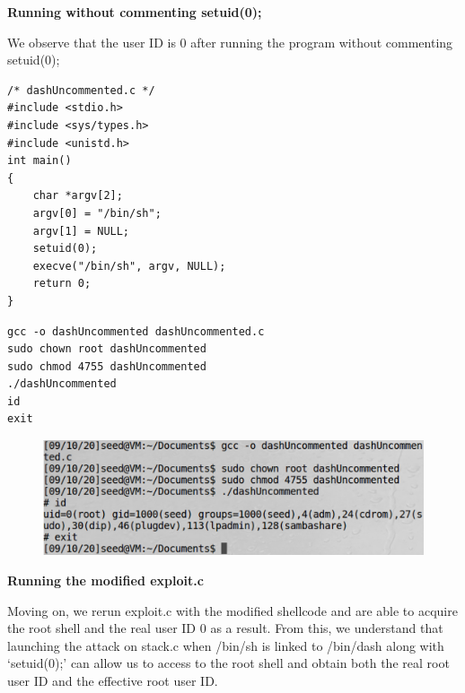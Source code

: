 \documentclass[12pt]{article}
\def\bsq#1{\lq{#1}\rq}
\begin{document}
\newpage

\begin{center}
    \textbf{Running without commenting setuid(0);}
\end{center}

\noindent
We observe that the user ID is 0 after running the program
without commenting setuid(0);

\begin{lstlisting}
/* dashUncommented.c */
#include <stdio.h>
#include <sys/types.h>
#include <unistd.h>
int main()
{
    char *argv[2];
    argv[0] = "/bin/sh";
    argv[1] = NULL;
    setuid(0);
    execve("/bin/sh", argv, NULL);
    return 0;
}
\end{lstlisting}

\begin{framed}
    \begin{verbatim}
gcc -o dashUncommented dashUncommented.c
sudo chown root dashUncommented
sudo chmod 4755 dashUncommented
./dashUncommented
id
exit
    \end{verbatim}
\end{framed}

\begin{figure}[H]
    \centering
    \includegraphics[width=1\textwidth]{bf-dash-uncommented.png}
\end{figure}



\newpage

\begin{center}
    \textbf{Running the modified exploit.c}
\end{center}

\noindent
Moving on, we rerun exploit.c with the modified shellcode and are able to acquire
the root shell and the real user ID 0 as a result. From this, we understand that
launching the attack on stack.c when /bin/sh is linked to /bin/dash along with
\bsq{setuid(0);} can allow us to access to the root shell and obtain both
the real root user ID and the effective root user ID.
\end{document}
